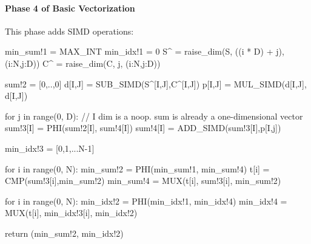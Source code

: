 \paragraph{Phase 4 of Basic Vectorization}

This phase adds SIMD operations:

{\small
\begin{pythonn}
min_sum!1 = MAX_INT
min_idx!1 = 0
S^ = raise_dim(S, ((i * D) + j), (i:N,j:D))
C^ = raise_dim(C, j, (i:N,j:D))

sum!2 = [0,..,0]
d[I,J] = SUB_SIMD(S^[I,J],C^[I,J])
p[I,J] = MUL_SIMD(d[I,J], d[I,J])

for j in range(0, D):
  // I dim is a noop. sum is already a one-dimensional vector
  sum!3[I] = PHI(sum!2[I], sum!4[I])       
  sum!4[I] = ADD_SIMD(sum!3[I],p[I,j])

min_idx!3 = [0,1,...N-1]   

for i in range(0, N):
  min_sum!2 = PHI(min_sum!1, min_sum!4) 
  t[i] = CMP(sum!3[i],min_sum!2)
  min_sum!4 = MUX(t[i], sum!3[i], min_sum!2)
    
for i in range(0, N):
  min_idx!2 = PHI(min_idx!1, min_idx!4)  
  min_idx!4 = MUX(t[i], min_idx!3[i], min_idx!2)
   
return (min_sum!2, min_idx!2)   
\end{pythonn}
}




